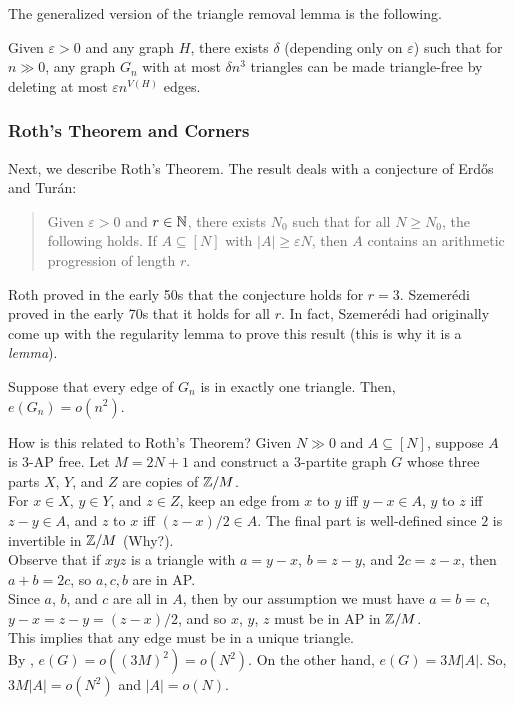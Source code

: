 			The generalized version of the triangle removal lemma is the following.

			\begin{ftheo}
				Given $\varepsilon>0$ and any graph $H$, there exists $\delta$ (depending only on $\varepsilon$) such that for $n\gg 0$, any graph $G_n$ with at most $\delta n^3$ triangles can be made triangle-free by deleting at most $\varepsilon n^{V(H)}$ edges.
			\end{ftheo}

		\subsubsection{Roth's Theorem and Corners}

			Next, we describe Roth's Theorem. The result deals with a conjecture of Erd\H{o}s and Tur\'{a}n:
			\begin{quote}
				Given $\varepsilon > 0$ and $r\in\mathbb{N}$, there exists $N_0$ such that for all $N \ge N_0$, the following holds. If $A \subseteq [N]$ with $|A| \ge \varepsilon N$, then $A$ contains an arithmetic progression of length $r$. 
			\end{quote}

			Roth proved in the early 50s that the conjecture holds for $r=3$. Szemer\'{e}di proved in the early 70s that it holds for all $r$. In fact, Szemer\'{e}di had originally come up with the regularity lemma to prove this result (this is why it is a \emph{lemma}).

			\begin{flem}
				\label{lemma: roth's theorem edge in unique triangle}
				Suppose that every edge of $G_n$ is in exactly one triangle. Then, $e(G_n) = o(n^2)$.
			\end{flem}

			How is this related to Roth's Theorem? Given $N\gg 0$ and $A\subseteq[N]$, suppose $A$ is $3$-AP free. Let $M = 2N+1$ and construct a $3$-partite graph $G$ whose three parts $X$, $Y$, and $Z$ are copies of $\mathbb{Z}/M$.\\
			For $x\in X$, $y\in Y$, and $z\in Z$, keep an edge from $x$ to $y$ iff $y-x \in A$, $y$ to $z$ iff $z-y \in A$, and $z$ to $x$ iff $(z-x)/2 \in A$. The final part is well-defined since $2$ is invertible in $\mathbb{Z}/M$ (Why?). \\
			Observe that if $xyz$ is a triangle with $a = y-x$, $b = z-y$, and $2c = z-x$, then $a+b=2c$, so $a,c,b$ are in AP.\\
			Since $a$, $b$, and $c$ are all in $A$, then by our assumption we must have $a=b=c$, $y-x=z-y=(z-x)/2$, and so $x$, $y$, $z$ must be in AP in $\mathbb{Z}/M$.\\
			This implies that any edge must be in a unique triangle.\\
			By , $e(G) = o((3M)^2) = o(N^2)$. On the other hand, $e(G) = 3M|A|$. So, $3M|A| = o(N^2)$ and $|A| = o(N)$.

